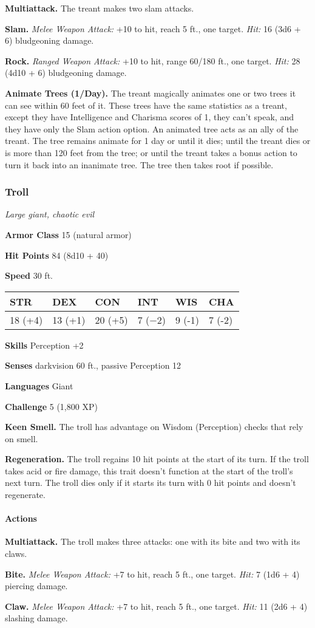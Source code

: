 \documentclass[
]{article}
\begin{document}
\textbf{Multiattack.} The treant makes two slam attacks.

\textbf{Slam.} \emph{Melee Weapon Attack:} +10 to hit, reach 5 ft., one
target. \emph{Hit:} 16 (3d6 + 6) bludgeoning damage.

\textbf{Rock.} \emph{Ranged Weapon Attack:} +10 to hit, range 60/180
ft., one target. \emph{Hit:} 28 (4d10 + 6) bludgeoning damage.

\textbf{Animate Trees (1/Day).} The treant magically animates one or two
trees it can see within 60 feet of it. These trees have the same
statistics as a treant, except they have Intelligence and Charisma
scores of 1, they can't speak, and they have only the Slam action
option. An animated tree acts as an ally of the treant. The tree remains
animate for 1 day or until it dies; until the treant dies or is more
than 120 feet from the tree; or until the treant takes a bonus action to
turn it back into an inanimate tree. The tree then takes root if
possible.

\hypertarget{troll}{%
\subsubsection{Troll}\label{troll}}

\emph{Large giant, chaotic evil}

\textbf{Armor Class} 15 (natural armor)

\textbf{Hit Points} 84 (8d10 + 40)

\textbf{Speed} 30 ft.

\begin{longtable}[]{@{}llllll@{}}
\toprule
STR & DEX & CON & INT & WIS & CHA\tabularnewline
\midrule
\endhead
18 (+4) & 13 (+1) & 20 (+5) & 7 (−2) & 9 (-1) & 7 (-2)\tabularnewline
\bottomrule
\end{longtable}

\textbf{Skills} Perception +2

\textbf{Senses} darkvision 60 ft., passive Perception 12

\textbf{Languages} Giant

\textbf{Challenge} 5 (1,800 XP)

\textbf{Keen Smell.} The troll has advantage on Wisdom (Perception)
checks that rely on smell.

\textbf{Regeneration.} The troll regains 10 hit points at the start of
its turn. If the troll takes acid or fire damage, this trait doesn't
function at the start of the troll's next turn. The troll dies only if
it starts its turn with 0 hit points and doesn't regenerate.

\hypertarget{actions-2}{%
\paragraph{Actions}\label{actions-2}}

\textbf{Multiattack.} The troll makes three attacks: one with its bite
and two with its claws.

\textbf{Bite.} \emph{Melee Weapon Attack:} +7 to hit, reach 5 ft., one
target. \emph{Hit:} 7 (1d6 + 4) piercing damage.

\textbf{Claw.} \emph{Melee Weapon Attack:} +7 to hit, reach 5 ft., one
target. \emph{Hit:} 11 (2d6 + 4) slashing damage.
\end{document}
